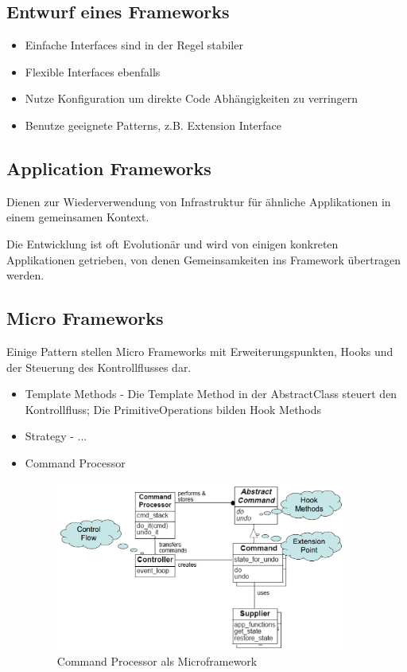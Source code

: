 \subsection{Entwurf eines Frameworks}

\begin{itemize}
	\item Einfache Interfaces sind in der Regel stabiler
	\item Flexible Interfaces ebenfalls
	\item Nutze Konfiguration um direkte Code Abhängigkeiten zu verringern
	\item Benutze geeignete Patterns, z.B. Extension Interface
\end{itemize}

\subsection{Application Frameworks}

Dienen zur Wiederverwendung von Infrastruktur für ähnliche Applikationen in einem gemeinsamen Kontext.

Die Entwicklung ist oft Evolutionär und wird von einigen konkreten Applikationen getrieben, von denen Gemeinsamkeiten ins Framework übertragen werden.

\subsection{Micro Frameworks}

Einige Pattern stellen Micro Frameworks mit Erweiterungspunkten, Hooks und der Steuerung des Kontrollflusses dar.

\begin{itemize}
	\item Template Methods - Die Template Method in der AbstractClass steuert den Kontrollfluss; Die PrimitiveOperations bilden Hook Methods
	\item Strategy - ...
	\item Command Processor

	\begin{figure}[H]
		\centering
		\includegraphics[width=0.9\textwidth]{content/frameworks/commandprocessormicroframework.png}
		\caption{Command Processor als Microframework}
	\end{figure}
\end{itemize}